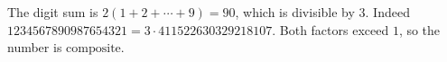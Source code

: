 The digit sum is $2(1+2+\cdots+9)=90$, which is divisible by $3$. Indeed $1234567890987654321=3\cdot411522630329218107$. Both factors exceed $1$, so the number is $\boxed{\text{composite}}$.
